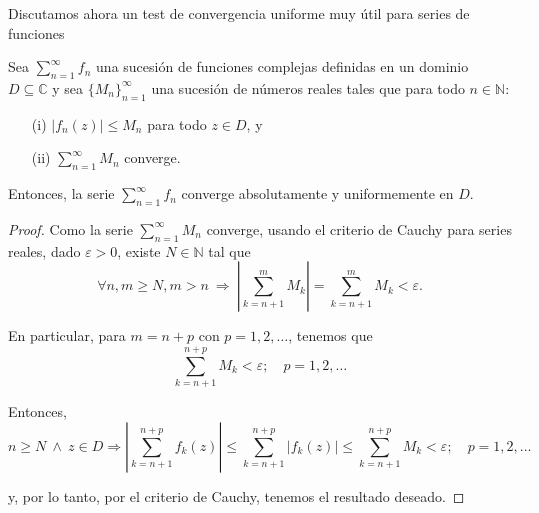 Discutamos ahora un test de convergencia uniforme muy útil para series de funciones

\begin{teorema} 
Sea $ \sum\limits_{n=1}^{\infty} f_n$ una sucesión de funciones complejas definidas en un dominio $D \subseteq \mathbb{C}$ y sea $\{M_n\}_{n=1}^{\infty}$ una sucesión de números reales tales que para todo $n \in \mathbb{N}$:
\begin{itemize}
    \item[(i)] $|f_n(z)| \leq M_n$ para todo $z \in D$, y
    
    \item[(ii)] $\sum\limits_{n=1}^{\infty} M_n $ converge.
\end{itemize}

 Entonces, la serie $\sum\limits_{n=1}^{\infty} f_n$ converge absolutamente y uniformemente en $D$.
 
\end{teorema}

\begin{proof}
Como la serie $\sum\limits_{n=1}^{\infty} M_n$ converge, usando el criterio de Cauchy para series reales, dado $\varepsilon > 0$, existe $N \in \mathbb{N}$ tal que
$$\forall n ,m \geq N, m > n ~\Rightarrow~ \left| \sum_{k=n+1}^m M_k  \right| =  \sum_{k=n+1}^m M_k < \varepsilon. $$

En particular, para $m = n + p$ con $p = 1,2, \dots$, tenemos que
$$\sum_{k=n+1}^{n + p} M_k < \varepsilon; \quad p = 1,2, \dots$$

Entonces,
$$  n \geq N ~\wedge~  z \in D \Rightarrow \left|\sum_{k = n+1}^{n+p} f_k(z) \right| 
\leq \sum_{k = n+1}^{n+p} |f_k(z)| 
 \leq  \sum_{k=n+1}^{n + p} M_k < \varepsilon; \quad p = 1,2, \dots
$$

y, por lo tanto, por el criterio de Cauchy, tenemos el resultado deseado.
\end{proof}

